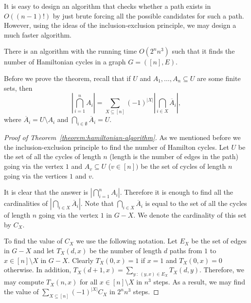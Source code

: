 It is easy to design an algorithm that checks whether a path exists in
$O((n - 1)!)$ by just brute forcing all the possible candidates for such a path.
However, using the ideas of the inclusion-exclusion principle, we may design
a much faster algorithm.
\begin{theorem}
\label{theorem:hamiltonian-algorithm}
  There is an algorithm with the running time $O(2^n n^3)$ such that it finds
  the number of Hamiltonian cycles in a graph $G = ([n], E)$.
\end{theorem}

Before we prove the theorem, recall that if $U$ and
$A_1, \dots, A_n \subseteq U$ are some finite sets, then
\[
  \left| \bigcap_{i = 1}^n A_i \right| =
  \sum_{X \subseteq [n]} (-1)^{|X|}
    \left| \bigcap_{i \in X} \overline{A}_i \right|,
\]
where $\overline{A}_i = U \setminus A_i$ and
$\bigcap_{i \in \emptyset} \overline{A}_i = U$.

\begin{proof}[Proof of Theorem~\ref{theorem:hamiltonian-algorithm}]
  As we mentioned before we the inclusion-exclusion principle to find the number
  of Hamilton cycles. Let $U$ be the set of all the cycles of length $n$
  (length is the number of edges in the path) going
  via the vertex $1$ and $A_v \subseteq U$ ($v \in [n])$ be the set of cycles of
  length $n$ going via the vertices $1$ and $v$.

  It is clear that the answer is $\left| \bigcap_{i = 1}^n A_i \right|$.
  Therefore it is enough to find all the cardinalities of
  $\left| \bigcap_{i \in X} \overline{A}_i \right|$. Note that
  $\bigcap_{i \in X} \overline{A}_i$ is equal to the set of all the cycles of
  length $n$ going via the vertex $1$ in $G - X$. We denote the cardinality of
  this set by $C_X$.

  To find the value of $C_X$ we use the following notation.
  Let $E_X$ be the set of edges in $G - X$ and let $T_X(d, x)$ be
  the number of length $d$ paths from $1$ to $x \in [n] \setminus X$ in $G - X$.
  Clearly $T_X(0, x) = 1$ if $x = 1$ and $T_X(0, x) = 0$ otherwise. In addition,
  $T_X(d + 1, x) = \sum_{y ~:~ (y, x) \in E_X} T_X(d, y)$. Therefore, we may
  compute $T_X(n, x)$ for all $x \in [n] \setminus X$ in $n^3$ steps. As a
  result, we may find the value of $\sum_{X \subseteq [n]} (-1)^{|X|} C_X$ in
  $2^n n^3$ steps.
\end{proof}

